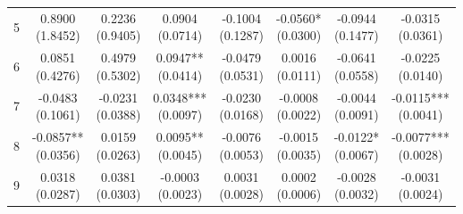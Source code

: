 \begin{table}[!htbp]
\begin{threeparttable}
\begin{tabular}{@{}lccccccc@{}}
5 & \shortstack{0.8900\\(1.8452)} & \shortstack{0.2236\\(0.9405)} & \shortstack{0.0904\\(0.0714)} & \shortstack{-0.1004\\(0.1287)} & \shortstack{-0.0560*\\(0.0300)} & \shortstack{-0.0944\\(0.1477)} & \shortstack{-0.0315\\(0.0361)} \\
6 & \shortstack{0.0851\\(0.4276)} & \shortstack{0.4979\\(0.5302)} & \shortstack{0.0947**\\(0.0414)} & \shortstack{-0.0479\\(0.0531)} & \shortstack{0.0016\\(0.0111)} & \shortstack{-0.0641\\(0.0558)} & \shortstack{-0.0225\\(0.0140)} \\
7 & \shortstack{-0.0483\\(0.1061)} & \shortstack{-0.0231\\(0.0388)} & \shortstack{0.0348***\\(0.0097)} & \shortstack{-0.0230\\(0.0168)} & \shortstack{-0.0008\\(0.0022)} & \shortstack{-0.0044\\(0.0091)} & \shortstack{-0.0115***\\(0.0041)} \\
8 & \shortstack{-0.0857**\\(0.0356)} & \shortstack{0.0159\\(0.0263)} & \shortstack{0.0095**\\(0.0045)} & \shortstack{-0.0076\\(0.0053)} & \shortstack{-0.0015\\(0.0035)} & \shortstack{-0.0122*\\(0.0067)} & \shortstack{-0.0077***\\(0.0028)} \\
9 & \shortstack{0.0318\\(0.0287)} & \shortstack{0.0381\\(0.0303)} & \shortstack{-0.0003\\(0.0023)} & \shortstack{0.0031\\(0.0028)} & \shortstack{0.0002\\(0.0006)} & \shortstack{-0.0028\\(0.0032)} & \shortstack{-0.0031\\(0.0024)} \\

\end{tabular}
\end{threeparttable}
\end{table}
